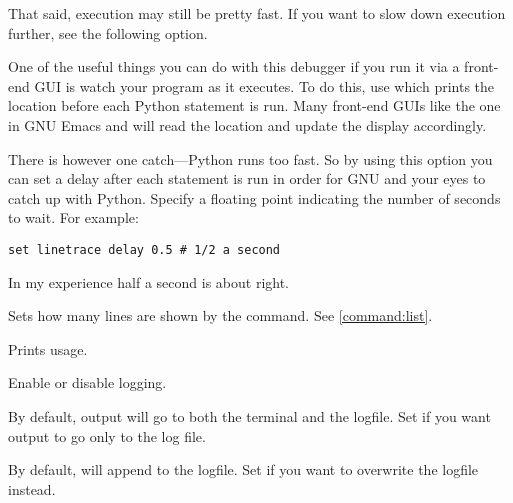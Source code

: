 \begin{description}
That said, execution may still be pretty fast. If you want to slow
down execution further, see the following option.

\item[set linetrace delay \var{time}]\label{command:linetrace-delay}

One of the useful things you can do with this debugger if you run it
via a front-end GUI is watch your program as it executes. To do this,
use  which prints the location before each
Python statement is run. Many front-end GUIs like the one in GNU Emacs
and  will read the location and update the display
accordingly.

There is however one catch---Python runs too fast. So by using this
option you can set a delay after each statement is run in order for
GNU and your eyes to catch up with Python. Specify a floating
point indicating the number of seconds to wait. For example: 

\begin{verbatim}
set linetrace delay 0.5 # 1/2 a second
\end{verbatim}

In my experience half a second is about right.

\item[set listsize \var{lines}]\label{command:listsize}

Sets how many lines are shown by the  command. See
\ref{command:list}.

\item[set logging]\label{command:logging}

Prints  usage.

\item[set logging on\code{\Large{|}}off]\label{command:logging}

Enable or disable logging.

\item[set logging file \var{filename}]\label{command:log-redirect}

By default,  output will go to both the terminal and the
logfile.  Set  if you want output to go only to the log
file.

\item[set logging overwrite on\code{\Large{|}}off]\label{command:log-overwrite}

By default,  will append to the logfile.  Set
 if you want  to overwrite the
logfile instead.


\end{description}
